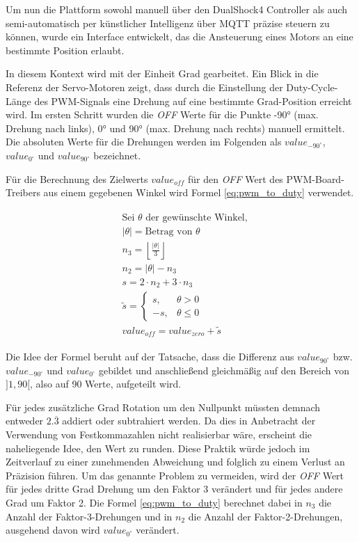 Um nun die Plattform sowohl manuell über den DualShock4 Controller als auch semi-automatisch per künstlicher Intelligenz über MQTT präzise steuern zu können, wurde ein Interface entwickelt, das die Ansteuerung eines Motors an eine bestimmte Position erlaubt. 

In diesem Kontext wird mit der Einheit Grad gearbeitet. 
Ein Blick in die Referenz \cite{esp_servo_control} der Servo-Motoren zeigt, dass durch die Einstellung der Duty-Cycle-Länge des PWM-Signals eine Drehung auf eine bestimmte Grad-Position erreicht wird. 
Im ersten Schritt wurden die \textit{OFF} Werte für die Punkte \ang{-90} (max. Drehung nach links), \ang{0} und \ang{90} (max. Drehung nach rechts) manuell ermittelt.
Die absoluten Werte für die Drehungen werden im Folgenden als $value_{-90^\circ}$, $value_{0^\circ}$ und $value_{90^\circ}$ bezeichnet.

Für die Berechnung des Zielwerts $value_{off}$ für den \textit{OFF} Wert des PWM-Board-Treibers aus einem gegebenen Winkel wird Formel \ref{eq:pwm_to_duty} verwendet.

\begin{gather}
    \begin{aligned}
    &\text{Sei } \theta \text{ der gewünschte Winkel,} \\
    &|\theta| = \text{Betrag von } \theta \\
    &n_3 = \left\lfloor \frac{|\theta|}{3} \right\rfloor \\
    &n_2 = |\theta| - n_3 \\
    &s = 2 \cdot n_2 + 3 \cdot n_3 \\
    &\tilde{s} =
    \begin{cases}
    s, & \theta > 0 \\
    -s, & \theta \leq 0
    \end{cases} \\
    &value_{off} = value_{zero} + \tilde{s}
    \end{aligned}
    \label{eq:pwm_to_duty}
\end{gather}

Die Idee der Formel beruht auf der Tatsache, dass die Differenz aus $value_{90^\circ}$ bzw. $value_{-90^\circ}$ und $value_{0^\circ}$ gebildet und anschließend gleichmäßig auf den Bereich von $]1, 90[$, also auf 90 Werte, aufgeteilt wird. 

Für jedes zusätzliche Grad Rotation um den Nullpunkt müssten demnach entweder $2.\overline{3}$ addiert oder subtrahiert werden.
Da dies in Anbetracht der Verwendung von Festkommazahlen nicht realisierbar wäre, erscheint die naheliegende Idee, den Wert zu runden. 
Diese Praktik würde jedoch im Zeitverlauf zu einer zunehmenden Abweichung und folglich zu einem Verlust an Präzision führen.
Um das genannte Problem zu vermeiden, wird der \textit{OFF} Wert für jedes dritte Grad Drehung um den Faktor 3 verändert und für jedes andere Grad um Faktor 2.
Die Formel \ref{eq:pwm_to_duty} berechnet dabei in $n_3$ die Anzahl der Faktor-3-Drehungen und in $n_2$ die Anzahl der Faktor-2-Drehungen, ausgehend davon wird $value_{0^\circ}$ verändert.

